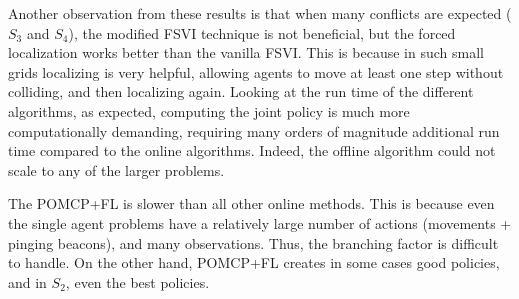\documentclass[letterpaper]{article} %
\begin{document}
Another observation from these results is that when many conflicts are expected ($S_3$ and $S_4$), the modified FSVI technique is not beneficial, but the forced localization works better than the vanilla FSVI.
This is because in such small grids localizing is very helpful, allowing agents to move at least one step without colliding, and then localizing again.
Looking at the run time of the different algorithms, as expected, computing the joint policy is much more computationally demanding, requiring many orders of magnitude additional run time compared to the online algorithms. Indeed, the offline algorithm could not scale to any of the larger problems.

The POMCP+FL is slower than all other online methods. This is because even the single agent problems have a relatively large number of actions (movements + pinging beacons), and many observations. Thus, the branching factor is difficult to handle. On the other hand, POMCP+FL creates in some cases good policies, and in $S_2$, even the best policies.
\end{document}
